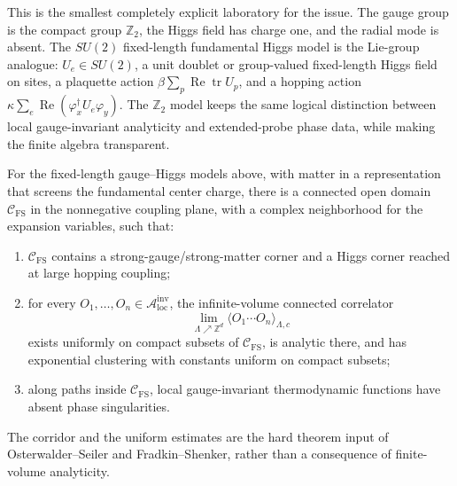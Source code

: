 This is the smallest completely explicit laboratory for the issue.  The gauge
group is the compact group \(\mathbb Z_2\), the Higgs field has charge one,
and the radial mode is absent.  The \(SU(2)\) fixed-length fundamental Higgs
model is the Lie-group analogue: \(U_e\in SU(2)\), a unit doublet or
group-valued fixed-length Higgs field on sites, a plaquette action
\(\beta\sum_p \operatorname{Re}\operatorname{tr}U_p\), and a hopping action
\(\kappa\sum_e\operatorname{Re}(\varphi_x^\dagger U_e\varphi_y)\).  The
\(\mathbb Z_2\) model keeps the same logical distinction between local
gauge-invariant analyticity and extended-probe phase data, while making the
finite algebra transparent.

\begin{quotedtheorem}
\label{qthm:fradkin-shenker-os-corridor}
For the fixed-length gauge--Higgs models above, with matter in a representation
that screens the fundamental center charge, there is a connected open domain
\(\mathcal C_{\mathrm{FS}}\) in the nonnegative coupling plane, with a complex
neighborhood for the expansion variables, such that:
\begin{enumerate}[label=\textnormal{(\roman*)}]
\item \(\mathcal C_{\mathrm{FS}}\) contains a strong-gauge/strong-matter corner
  and a Higgs corner reached at large hopping coupling;
\item for every \(O_1,\ldots,O_n\in\mathcal A_{\mathrm{loc}}^{\mathrm{inv}}\),
  the infinite-volume connected correlator
  \[
    \lim_{\Lambda\nearrow\mathbb Z^d}
    \langle O_1\cdots O_n\rangle_{\Lambda,c}
  \]
  exists uniformly on compact subsets of \(\mathcal C_{\mathrm{FS}}\), is
  analytic there, and has exponential clustering with constants uniform on
  compact subsets;
\item along paths inside \(\mathcal C_{\mathrm{FS}}\), local gauge-invariant
  thermodynamic functions have absent phase singularities.
\end{enumerate}
The corridor and the uniform estimates are the hard theorem input of
Osterwalder--Seiler and Fradkin--Shenker, rather than a consequence of
finite-volume analyticity.
\end{quotedtheorem}

